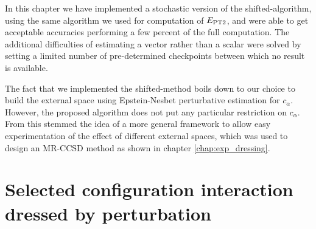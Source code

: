 \documentclass[./thesis.tex]{subfiles}
\begin{document}
In this chapter we have implemented a stochastic version of the shifted-\Bk algorithm, using the same algorithm we used for computation of $E_\text{PT2}$, and were able to get acceptable accuracies performing a few percent of the full computation.
The additional difficulties of estimating a vector rather than a scalar were solved by setting a limited number of pre-determined checkpoints between which no result is available.

The fact that we implemented the shifted-\Bk method boils down to our choice to build the external space using Epstein-Nesbet perturbative estimation for $c_\alpha$. However, the proposed algorithm does not put any particular restriction on $c_\alpha$. From this stemmed the idea of a more general framework to allow easy experimentation of the effect of different external spaces, which was used to design an MR-CCSD method as shown in chapter \ref{chap:exp_dressing}.


\clearpage
\section{Selected configuration interaction dressed by perturbation}
\label{sec:matrix_article}



\end{document}
